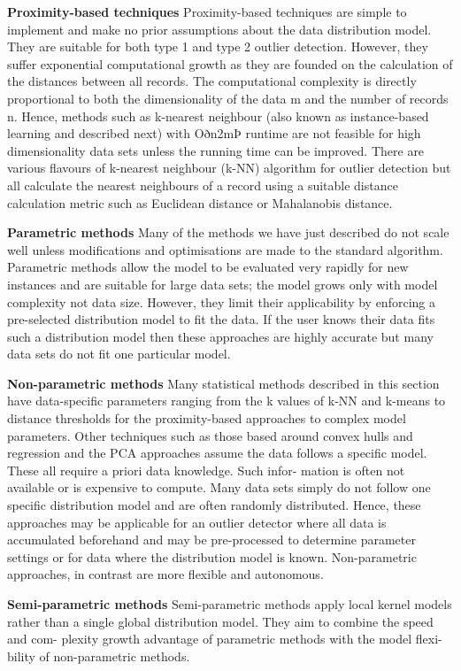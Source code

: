\textbf{Proximity-based techniques} 
Proximity-based techniques are simple to implement and make no prior assumptions about the data distribution model. They are suitable for both type 1 and type 2 outlier detection. However, they suffer exponential computational growth as they are founded on the calculation of the distances between all records. The computational complexity is directly proportional to both the dimensionality of the data m and the number of records n. Hence, methods such as k-nearest neighbour (also known as instance-based learning and described next) with Oðn2mÞ runtime are not feasible for high dimensionality data sets unless the running time can be improved. There are various flavours of k-nearest neighbour (k-NN) algorithm for outlier detection but all calculate the nearest neighbours of a record using a suitable distance calculation metric such as Euclidean distance or Mahalanobis distance.

\textbf{Parametric methods}
Many of the methods we have just described do not scale well unless modifications and optimisations are made to the standard algorithm. Parametric methods allow the model to be evaluated very rapidly for new instances and are suitable for large data sets; the model grows only with model complexity not data size. However, they limit their applicability by enforcing a pre-selected distribution model to fit the data. If the user knows their data fits such a distribution model then these approaches are highly accurate but many data sets do not fit one particular model.

\textbf{Non-parametric methods}
Many statistical methods described in this section have data-specific parameters ranging from the k values of k-NN and k-means to distance thresholds for the proximity-based approaches to complex model parameters. Other techniques such as those based around convex hulls and regression and the PCA approaches assume the data follows a specific model. These all require a priori data knowledge. Such infor- mation is often not available or is expensive to compute. Many data sets simply do not follow one specific distribution model and are often randomly distributed. Hence, these approaches may be applicable for an outlier detector where all data is accumulated beforehand and may be pre-processed to determine parameter settings or for data where the distribution model is known. Non-parametric approaches, in contrast are more flexible and autonomous.

\textbf{Semi-parametric methods}
Semi-parametric methods apply local kernel models rather than a single global distribution model. They aim to combine the speed and com- plexity growth advantage of parametric methods with the model flexi- bility of non-parametric methods.

